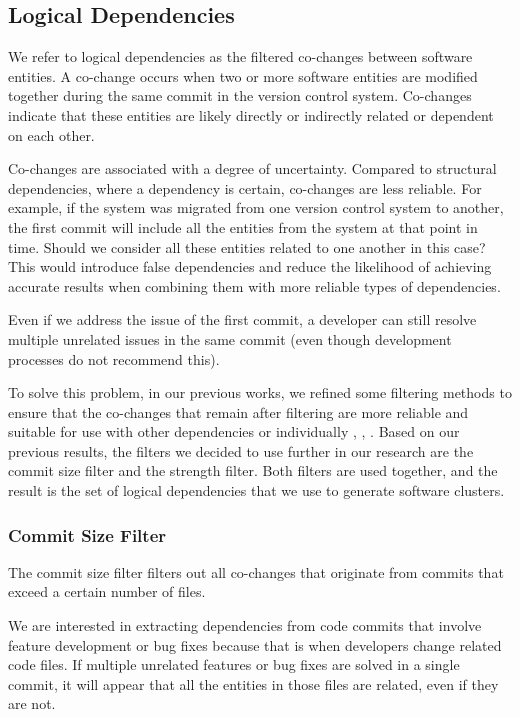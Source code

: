 \documentclass[12pt, a4paper, twoside]{report}
\begin{document}
\subsection{Logical Dependencies}
\label{subsec:ld}

We refer to logical dependencies as the filtered co-changes between software entities. A co-change occurs when two or more software entities are modified together during the same commit in the version control system. Co-changes indicate that these entities are likely directly or indirectly related or dependent on each other.

Co-changes are associated with a degree of uncertainty. Compared to structural dependencies, where a dependency is certain, co-changes are less reliable. For example, if the system was migrated from one version control system to another, the first commit will include all the entities from the system at that point in time. Should we consider all these entities related to one another in this case? This would introduce false dependencies and reduce the likelihood of achieving accurate results when combining them with more reliable types of dependencies.

Even if we address the issue of the first commit, a developer can still resolve multiple unrelated issues in the same commit (even though development processes do not recommend this).

To solve this problem, in our previous works, we refined some filtering methods to ensure that the co-changes that remain after filtering are more reliable and suitable for use with other dependencies or individually \cite{b4}, \cite{b5}, \cite{b6}. Based on our previous results, the filters we decided to use further in our research are the commit size filter and the strength filter. Both filters are used together, and the result is the set of logical dependencies that we use to generate software clusters.

\subsubsection{Commit Size Filter}

The commit size filter filters out all co-changes that originate from commits that exceed a certain number of files.

We are interested in extracting dependencies from code commits that involve feature development or bug fixes because that is when developers change related code files. If multiple unrelated features or bug fixes are solved in a single commit, it will appear that all the entities in those files are related, even if they are not.
\end{document}
